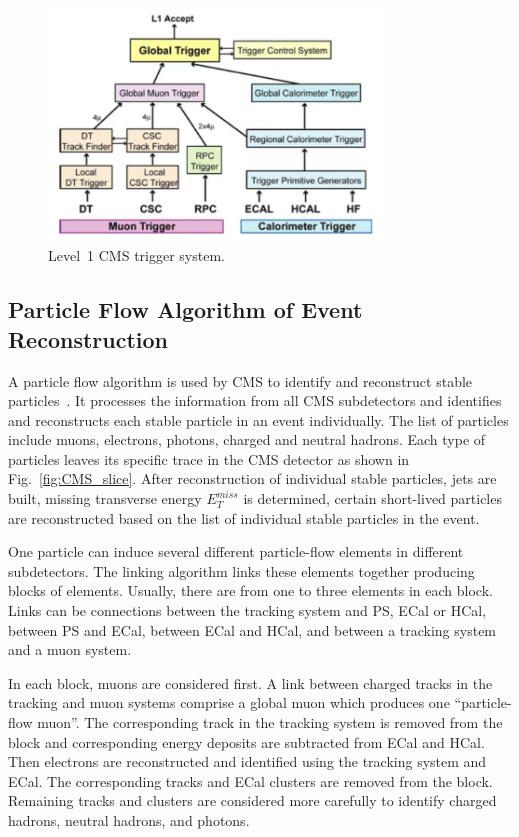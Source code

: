 \begin{figure}[htb]
  \begin{center}
    \includegraphics[width=0.8\textwidth]{../figs/Exp/trigger_L1.png}
    \caption{Level~1 CMS trigger system.}
    \label{fig:trigger_L1}
  \end{center}
\end{figure}

\subsection{Particle Flow Algorithm of Event Reconstruction}

A particle flow algorithm is used by CMS to identify and reconstruct stable particles~\cite{ref_ParticleFlowAlg}. It processes the information from all CMS subdetectors and identifies and reconstructs each stable particle in an event individually. The list of particles include muons, electrons, photons, charged and neutral hadrons. Each type of particles leaves its specific trace in the CMS detector as shown in Fig.~\ref{fig:CMS_slice}. After reconstruction of individual stable particles, jets are built, missing transverse energy $E_T^{miss}$ is determined, certain short-lived particles are reconstructed based on the list of individual stable particles in the event.

One particle can induce several different particle-flow elements in different subdetectors. The linking algorithm links these elements together producing blocks of elements. Usually, there are from one to three elements in each block. Links can be connections between the tracking system and PS, ECal or HCal, between PS and ECal, between ECal and HCal, and between a tracking system and a muon system. 

In each block, muons are considered first. A link between charged tracks in the tracking and muon systems comprise a global muon which produces one ``particle-flow muon''. The corresponding track in the tracking system is removed from the block and corresponding energy deposits are subtracted from ECal and HCal. Then electrons are reconstructed and identified using the tracking system and ECal. The corresponding tracks and ECal clusters are removed from the block. Remaining tracks and clusters are considered more carefully to identify charged hadrons, neutral hadrons, and photons.

